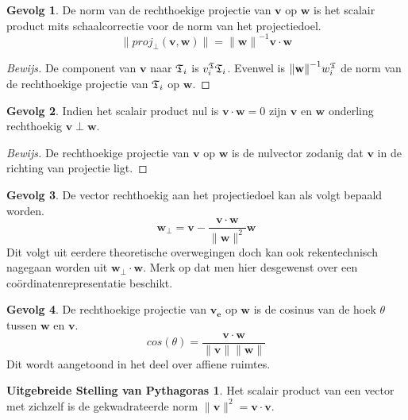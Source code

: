 \documentclass{amsart}
\theoremstyle{definition}
\newtheorem{csq}{Gevolg}[section]
\newenvironment{bewijs}{\begin{proof}[Bewijs]}{\end{proof}}
\newcommand{\norm}[1]{\lVert{#1}\rVert}
\newcommand{\vvec}[1][v]{\mathbf{#1}}
\newcommand{\uvec}[1][v]{\vvec[#1]_\mathbf{e}}
\newcommand{\vnorm}[1]{\norm{\vvec[#1]}}
\newcommand{\vecrow}[1][a]{\mathfrak{\MakeUppercase{#1}}}
\newcommand{\rvec}[2][i]{{#2}_{#1}}
\newcommand{\rvecr}[2][i]{\rvec[#1]{\vecrow[#2]}}
\newcommand{\vcord}[3]{{#1}_{#2}^{#3}}
\newcommand{\vcordv}[3][v]{\vcord{#1}{#2}{\vecrow[#3]}}
\newcommand{\vcordvi}[2][i]{\vcordv{#1}{#2}}
\begin{document}
\begin{csq}
    De norm van de rechthoekige projectie van $\vvec$ op $\vvec[w]$ is het scalair product mits schaalcorrectie voor de norm van het projectiedoel.
    \begin{equation*}
        \norm{proj_\perp(\vvec, \vvec[w])} = {\vnorm w}^{-1}\vvec \cdot \vvec[w]
    \end{equation*}
    \begin{bewijs}
        De component van $\vvec$ naar $\rvecr{t}$ is $\vcordvi{t}\rvecr{t}$. Evenwel is ${\vnorm w}^{-1}\vcordv[w]{i}{t}$ de norm van de rechthoekige projectie van $\rvecr{t}$ op $\vvec[w]$.
    \end{bewijs}
\end{csq}

\begin{csq}
    Indien het scalair product nul is $\vvec \cdot\vvec[w] = 0$ zijn $\vvec$ en $\vvec[w]$ onderling rechthoekig $\vvec\perp\vvec[w]$.
    \begin{bewijs}
        De rechthoekige projectie van $\vvec$ op $\vvec[w]$ is de nulvector zodanig dat $\vvec$ in de richting van projectie ligt.
    \end{bewijs}
\end{csq}

\begin{csq}
    De vector rechthoekig aan het projectiedoel kan als volgt bepaald worden.
    \begin{equation*}
        \vvec[w]_\perp = \vvec - \frac{\vvec\cdot\vvec[w]}{\vnorm w^2}\vvec[w]
    \end{equation*}
    Dit volgt uit eerdere theoretische overwegingen doch kan ook rekentechnisch nagegaan worden uit $\vvec[w]_\perp\cdot\vvec[w]$.
    Merk op dat men hier desgewenst over een coördinatenrepresentatie beschikt.
\end{csq}

\begin{csq}
    De rechthoekige projectie van $\uvec$ op $\vvec[w]$ is de cosinus van de hoek $\theta$ tussen $\vvec[w]$ en $\vvec$.
    \begin{equation*}
        cos(\theta) = \frac{\vvec \cdot \vvec[w]}{\vnorm v\vnorm w}
    \end{equation*}
    Dit wordt aangetoond in het deel over affiene ruimtes.
\end{csq}

\newtheorem*{pyth}{Uitgebreide Stelling van Pythagoras}
\begin{pyth}
    Het scalair product van een vector met zichzelf is de gekwadrateerde norm $\vnorm v^2 = \vvec\cdot\vvec$.
\end{pyth}
\end{document}
